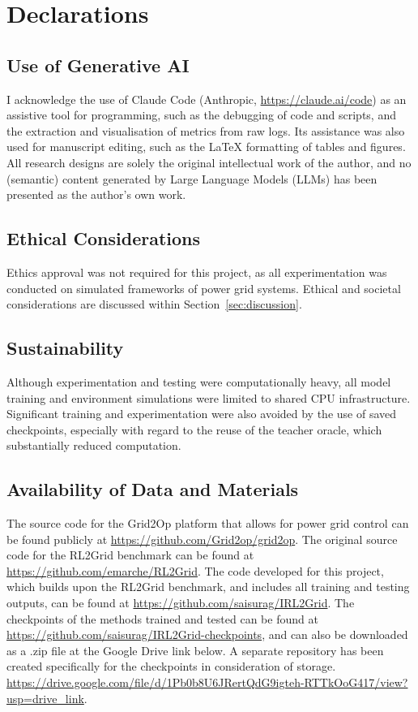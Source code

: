 \chapter{Declarations}
\label{ch:Declarations}

\section{Use of Generative AI}

I acknowledge the use of Claude Code (Anthropic, \url{https://claude.ai/code}) as an assistive tool for programming, such as the debugging of code and scripts, and the extraction and visualisation of metrics from raw logs. Its assistance was also used for manuscript editing, such as the LaTeX formatting of tables and figures. All research designs are solely the original intellectual work of the author, and no (semantic) content generated by Large Language Models (LLMs) has been presented as the author's own work.

\section{Ethical Considerations}

Ethics approval was not required for this project, as all experimentation was conducted on simulated frameworks of power grid systems. Ethical and societal considerations are discussed within Section~\ref{sec:discussion}.

\section{Sustainability}

Although experimentation and testing were computationally heavy, all model training and environment simulations were limited to shared CPU infrastructure. Significant training and experimentation were also avoided by the use of saved checkpoints, especially with regard to the reuse of the teacher oracle, which substantially reduced computation. 

\section{Availability of Data and Materials}

The source code for the Grid2Op platform that allows for power grid control can be found publicly at \url{https://github.com/Grid2op/grid2op}. The original source code for the RL2Grid benchmark can be found at \url{https://github.com/emarche/RL2Grid}. The code developed for this project, which builds upon the RL2Grid benchmark, and includes all training and testing outputs, can be found at \url{https://github.com/saisurag/IRL2Grid}. The checkpoints of the methods trained and tested can be found at \url{https://github.com/saisurag/IRL2Grid-checkpoints}, and can also be downloaded as a .zip file at the Google Drive link below. A separate repository has been created specifically for the checkpoints in consideration of storage. \url{https://drive.google.com/file/d/1Pb0b8U6JRertQdG9igteh-RTTkOoG417/view?usp=drive_link}.